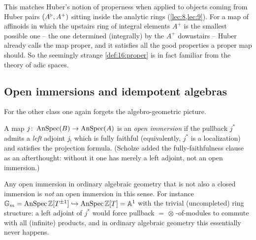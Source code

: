 \begin{remark}
\label{rmk:16:proper-huber}
This matches Huber's notion of properness when applied to objects coming from Huber
pairs $(A^{\triangleright},A^+)$ sitting inside the analytic rings (\cref{lec:8,lec:9}). For a map
of affinoids in which the upstairs ring of integral elements $A^+$ is the smallest
possible one -- the one determined (integrally) by the $A^+$ downstairs -- Huber already
calls the map proper, and it satisfies all the good properties a proper map should. So
the seemingly strange \cref{def:16:proper} is in fact familiar from the theory of adic
spaces.
\end{remark}

\subsection{Open immersions and idempotent algebras}
\label{subsec:16:open}

For the other class one again forgets the algebro-geometric picture.

\begin{definition}
\label{def:16:open}
A map $j\colon\operatorname{AnSpec}(B)\to\operatorname{AnSpec}(A)$ is an \emph{open immersion} if the pullback
$j^*$ admits a \emph{left} adjoint $j_!$ which is fully faithful (equivalently,
$j^*$ is a localization) and satisfies the projection formula. (Scholze added the
fully-faithfulness clause as an afterthought: without it one has merely a left
adjoint, not an open immersion.)
\end{definition}

\begin{remark}
\label{rmk:16:open-nonexample}
Any open immersion in ordinary algebraic geometry that is not also a closed immersion
is \emph{not} an open immersion in this sense. For instance
$\mathbb{G}_{m}=\operatorname{AnSpec}\mathbb{Z}[T^{\pm1}]\hookrightarrow\operatorname{AnSpec}\mathbb{Z}[T]=\mathbb{A}^1$ with
the trivial (uncompleted) ring structure: a left adjoint of $j^*$ would force pullback
$=\,\otimes\,$-of-modules to commute with all (infinite) products, and in ordinary
algebraic geometry this essentially never happens.
\end{remark}

